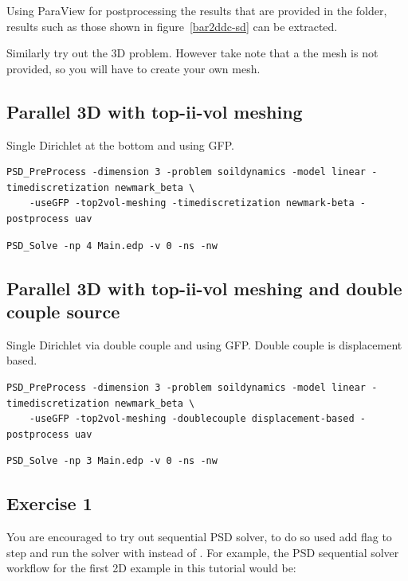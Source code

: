 Using ParaView for postprocessing the results that are provided in the  folder, results such as those shown in figure~\ref{bar2ddc-sd} can be extracted.

Similarly try out the 3D problem. However take note that a the mesh  is not provided, so you will have to create your own mesh. 


\subsection{Parallel 3D with top-ii-vol meshing}

Single Dirichlet at the bottom and using GFP.

\begin{lstlisting}[style=BashInputStyle]
	PSD_PreProcess -dimension 3 -problem soildynamics -model linear -timediscretization newmark_beta \
	-useGFP -top2vol-meshing -timediscretization newmark-beta -postprocess uav
\end{lstlisting}

\begin{lstlisting}[style=BashInputStyle]
	PSD_Solve -np 4 Main.edp -v 0 -ns -nw 
\end{lstlisting}


\subsection{Parallel 3D with top-ii-vol meshing and double couple source}

Single Dirichlet via double couple and using GFP. Double couple is displacement based. 

\begin{lstlisting}[style=BashInputStyle]
	PSD_PreProcess -dimension 3 -problem soildynamics -model linear -timediscretization newmark_beta \
	-useGFP -top2vol-meshing -doublecouple displacement-based -postprocess uav
\end{lstlisting}

\begin{lstlisting}[style=BashInputStyle]
	PSD_Solve -np 3 Main.edp -v 0 -ns -nw 
\end{lstlisting}

\subsection{Exercise  1}

You are encouraged to try out sequential PSD solver, to do so used add  flag to  step and run the solver with  instead of . For example, the PSD sequential solver workflow for the first 2D example in this tutorial would be:

